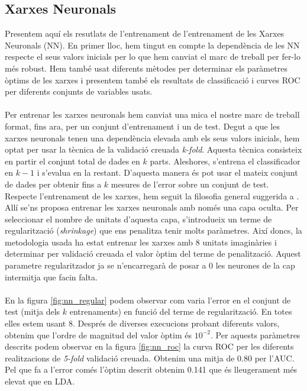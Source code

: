 \documentclass[a4paper,10pt]{article}
\begin{document}
\subsection{Xarxes Neuronals}
Presentem aquí els resutlats de l'entrenament de l'entrenament de les Xarxes Neuronals (NN). En primer lloc, hem tingut en compte la dependència de les NN respecte el seus valors inicials per lo que hem canviat el marc de treball per fer-lo més robust. Hem també  usat diferents mètodes per determinar els paràmetres òptims de les xarxes i presentem també els resultats de classificació i curves ROC per diferents conjunts de variables usats.
\\
\\
Per entrenar les xarxes neuronals hem canviat una mica el nostre marc de treball format, fins ara, per un conjunt d'entrenament i un de test. Degut a que les xarxes neuronals tenen una dependència elevada amb els seus valors inicials, hem optat per usar la tècnica de la validació creuada \textit{k-fold}. Aquesta tècnica consisteix en partir el conjunt total de dades en $k$ parts. Aleshores, s'entrena el classificador en $k-1$ i s'evalua en la restant. D'aquesta manera és pot usar el mateix conjunt de dades per obtenir fins a $k$ mesures de l'error sobre un conjunt de test. Respecte l'entrenament de les xarxes, hem seguit la filosofia general suggerida a \cite{hastie09}. Allí se'ns proposa entrenar les xarxes neuronals amb només una capa oculta. Per seleccionar el nombre de unitats d'aquesta capa, s'introdueix un terme de regularització (\textit{shrinkage}) que ens penalitza tenir molts paràmetres. Així doncs, la metodologia usada ha estat entrenar les xarxes amb 8 unitats imaginàries i determinar per validació creuada el valor òptim del terme de penalització. Aquest parametre regularitzador ja se n'encarregarà de posar a 0 les neurones de la cap intermitja que facin falta. 
\\
\\
En la figura \ref{fig:nn_regular} podem observar com varia l'error en el conjunt de test (mitja dels $k$ entrenaments) en funció del terme de regularització. En totes elles estem usant 8. Després de diverses execucions probant diferents valors, obtenim que l'ordre de magnitud del valor òptim és $10^{-2}$. Per aquests paràmetres descrits podem observar en la figura \ref{fig:nn_roc} la curva ROC per les diferents realitzacions de \textit{5-fold} validació creuada. Obtenim una mitja de 0.80 per l'AUC. Pel que fa a l'error comés l'òptim descrit obtenim 0.141 que és lleugerament més elevat que en LDA. 
\end{document}
